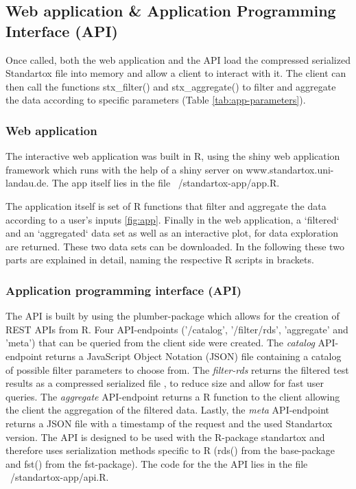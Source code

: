 \subsection*{Web application \& Application Programming Interface (API)}

Once called, both the web application and the API load the compressed serialized Standartox file into memory and allow a client to interact with it. The client can then call the functions stx\_filter() and stx\_aggregate() to filter and aggregate the data according to specific parameters (Table \ref{tab:app-parameters}).

\subsubsection*{Web application}
The interactive web application was built in R, using the shiny web application framework \citep{chang_shiny_2018} which runs with the help of a shiny server \citep{HOW-TO-CITE-SHINY-SERVER} on www.standartox.uni-landau.de. The app itself lies in the file ~/standartox-app/app.R.


The application itself is set of R functions that filter and aggregate the data according to a user's inputs \ref{fig:app}. Finally in the web application, a `filtered` and an `aggregated` data set as well as an interactive plot, for data exploration are returned. These two data sets can be downloaded. In the following these two parts are explained in detail, naming the respective R scripts in brackets.

\subsubsection*{Application programming interface (API)}
The API is built by using the plumber-package \citep{trestletechnologyllc_plumber_2018} which allows for the creation of REST APIs from R. Four API-endpoints ('/catalog', '/filter/rds', 'aggregate' and 'meta') that can be queried from the client side were created. The \textit{catalog} API-endpoint returns a JavaScript Object Notation (JSON) file containing a catalog of possible filter parameters to choose from. The \textit{filter-rds} returns the filtered test results as a compressed serialized file \citep{klik_fst_2019}, to reduce size and allow for fast user queries. The \textit{aggregate} API-endpoint returns a R function to the client allowing the client the aggregation of the filtered data. Lastly, the \textit{meta} API-endpoint returns a JSON file with a timestamp of the request and the used Standartox version. The API is designed to be used with the R-package standartox and therefore uses serialization methods specific to R (rds() from the base-package and fst() from the fst-package). The code for the the API lies in the file ~/standartox-app/api.R.


